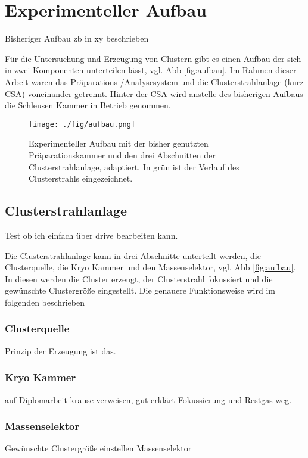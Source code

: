 \chapter{Experimenteller Aufbau}

Bisheriger Aufbau zb in xy beschrieben

Für die Untersuchung und Erzeugung von Clustern gibt es einen Aufbau der sich in zwei Komponenten unterteilen lässt, vgl. Abb \ref{fig:aufbau}.
Im Rahmen dieser Arbeit waren das Präparations-/Analysesystem und die Clusterstrahlanlage (kurz CSA) voneinander getrennt.
Hinter der CSA wird anstelle des bisherigen Aufbaus die Schleusen Kammer in Betrieb genommen.
\begin{figure}
    \centering
    \texttt{[image: ./fig/aufbau.png]}
    \caption{Experimenteller Aufbau mit der bisher genutzten Präparationskammer und den drei Abschnitten der Clusterstrahlanlage, \cite[S. 20]{wolter} adaptiert. 
    In grün ist der Verlauf des Clusterstrahls eingezeichnet.}
    \label{fig:csaaufbau}
\end{figure}

\section{Clusterstrahlanlage}
Test ob ich einfach über drive bearbeiten kann.

Die Clusterstrahlanlage kann in drei Abschnitte unterteilt werden, die Clusterquelle, die Kryo Kammer und den Massenselektor, vgl. Abb \ref{fig:aufbau}.
In diesen werden die Cluster erzeugt, der Clusterstrahl fokussiert und die gewünschte Clustergröße eingestellt. Die genauere Funktionsweise wird im folgenden beschrieben
\subsection{Clusterquelle}
Prinzip der Erzeugung ist das.
\subsection{Kryo Kammer}
auf Diplomarbeit krause verweisen, gut erklärt
Fokussierung und Restgas weg.
\subsection{Massenselektor}
Gewünschte Clustergröße einstellen 
Massenselektor \cite{Issendorff.1999}
